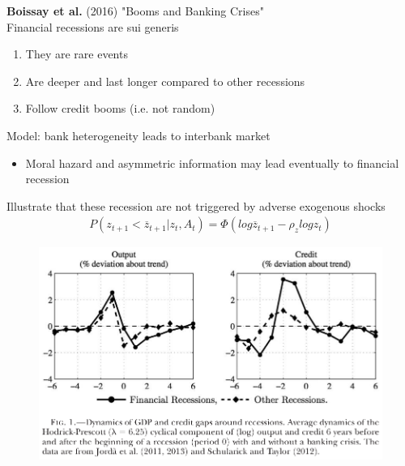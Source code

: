 \documentclass{beamer}
\begin{document}
\begin{frame}
  \textbf{Boissay et al.} (2016) "Booms and Banking Crises"\\ 
  \medskip
  Financial recessions are sui generis
  \begin{enumerate}
    \item They are rare events
    \item Are deeper and last longer compared to other recessions
    \item Follow credit booms (i.e. not random)
  \end{enumerate}
  \medskip
  Model: bank heterogeneity leads to interbank market
  \begin{itemize}
    \item Moral hazard and asymmetric information may lead eventually to financial recession
  \end{itemize}
  \medskip
  Illustrate that these recession are not triggered by adverse exogenous shocks
  \begin{align}
    P(z_{t+1}<\overline{z}_{t+1}|z_t,A_t) = \Phi(log \overline{z}_{t+1}-\rho_zlog z_t)
  \end{align}
\end{frame}

\begin{frame}
  \begin{figure}
    \includegraphics[scale=.7]{boissay.eps}
  \end{figure}
\end{frame}
\end{document}
